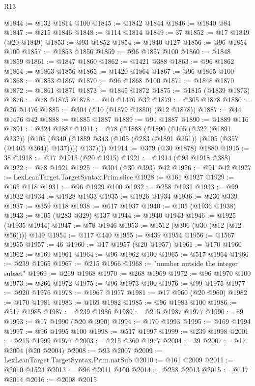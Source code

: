 \begin{lexlean}{R13}
\begin{coremodule}
@1844 := @132 @1814 @100
@1845 := @1842 @1844
@1846 := @1840 @84
@1847 := @215 @1846
@1848 := @114 @1814
@1849 := 37
@1852 := @17 @1849 (@20 @1849)
@1853 := @93 @1852
@1854 := @1840 @127
@1856 := @96 @1854 @100
@1857 := @1853 @1856
@1859 := @96 @1857 @100
@1860 := @1848 @1859
@1861 := @1847 @1860
@1862 := @1421 @388
@1863 := @96 @1862
@1864 := @1863 @1856
@1865 := @1420 @1864
@1867 := @96 @1865 @100
@1868 := @1853 @1867
@1870 := @96 @1868 @100
@1871 := @1848 @1870
@1872 := @1861 @1871
@1873 := @1845 @1872
@1875 := @1815 (@1839 @1873)
@1876 := @78 @1875
@1878 := @10 @1476 @32
@1879 := @305 @1878
@1880 := @26 @1476
@1885 := @304 (@10 (@1879 @1880) (@12 @1878))
@1887 := @44 @1476 @42
@1888 := @1885 @1887
@1889 := @91 @1887
@1890 := @1889 @116
@1891 := @324 @1887
@1911 := @78
    (@1888
      (@1890
        (@105
          (@322 (@1891 @332))
          (@105
            (@340 (@1889 @343 (@105 (@283 (@1891 @351)) (@105 (@357 (@1465 @364)) @137))))
            @137))))
@1914 := @379 (@30 @1878) @1880
@1915 := 38
@1918 := @17 @1915 (@20 @1915)
@1921 := @1914 (@93 @1918 @388)
@1922 := @78 @1921
@1925 := @304 (@30 @393) @42
@1926 := @91 @42
@1927 := LexLeanTarget.TargetSyntax.Prim.slice
@1928 := @161 @1927
@1929 := @165 @118
@1931 := @96 @1929 @100
@1932 := @258 @1931
@1933 := @99 @1932
@1934 := @1928 @1933
@1935 := @1926 @1934
@1936 := @236 @339
@1937 := @359 @118
@1938 := @617 @1937
@1940 := @105 (@1936 @1938)
@1943 := @105 (@283 @329) @137
@1944 := @1940 @1943
@1946 := @1925 (@1935 @1944)
@1947 := @78 @1946
@1953 := @1512 (@306 (@30 (@12 (@12 @56)))) @149
@1954 := @117 @440
@1955 := @439 @1954
@1956 := @1567 @1955
@1957 := 46
@1960 := @17 @1957 (@20 @1957)
@1961 := @170 @1960
@1962 := @169 @1961
@1964 := @96 @1962 @100
@1965 := @517 @1964
@1966 := @239 @1965
@1967 := @215 @1966
@1968 := "number outside the integer subset"
@1969 := @269 @1968
@1970 := @268 @1969
@1972 := @96 @1970 @100
@1973 := @266 @1972
@1975 := @96 @1973 @100
@1976 := @99 @1975
@1977 := @920 @1976
@1978 := @1967 @1977
@1981 := @17 @960 (@20 @960)
@1982 := @170 @1981
@1983 := @169 @1982
@1985 := @96 @1983 @100
@1986 := @517 @1985
@1987 := @239 @1986
@1989 := @215 @1987 @1977
@1990 := 69
@1993 := @17 @1990 (@20 @1990)
@1994 := @170 @1993
@1995 := @169 @1994
@1997 := @96 @1995 @100
@1998 := @517 @1997
@1999 := @239 @1998
@2001 := @215 @1999 @1977
@2003 := @215 @360 @1977
@2004 := 39
@2007 := @17 @2004 (@20 @2004)
@2008 := @93 @2007
@2009 := LexLeanTarget.TargetSyntax.Prim.natSub
@2010 := @161 @2009
@2011 := @2010 @1524
@2013 := @96 @2011 @100
@2014 := @258 @2013
@2015 := @117 @2014
@2016 := @2008 @2015

\end{coremodule}
\end{lexlean}
